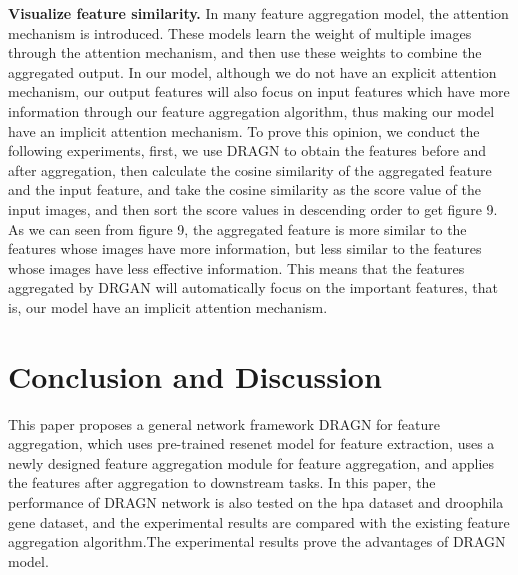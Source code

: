 \documentclass[10pt,twocolumn,letterpaper]{article}
\begin{document}
\textbf{Visualize feature similarity.} In many feature aggregation model, the attention mechanism is introduced. These models learn the weight of multiple images through the attention mechanism, and then use these weights to combine the aggregated output. In our model, although we do not have an explicit attention mechanism, our output features will also focus on input features which have more information through our feature aggregation algorithm, thus making our model have an implicit attention mechanism. To prove this opinion, we conduct the following experiments, first, we use DRAGN to obtain the features before and after aggregation, then calculate the cosine similarity of the aggregated feature and the input feature, and take the cosine similarity as the score value of the input images, and then sort the score values in descending order to get figure 9. As we can seen from figure 9, the aggregated feature is more similar to the features whose images have more information, but less similar to the features whose images have less effective information. This means that the features aggregated by DRGAN will automatically focus on the important features, that is, our model have an implicit attention mechanism.


\section{Conclusion and Discussion}
This paper proposes a general network framework DRAGN for feature aggregation, which uses pre-trained resenet model for feature extraction, uses a newly designed feature aggregation module for feature aggregation, and applies the features after aggregation to downstream tasks. In this paper, the performance of DRAGN network is also tested on the hpa dataset and droophila gene dataset, and the experimental results are compared with the existing feature aggregation algorithm.The experimental results prove the advantages of DRAGN model.
\end{document}
